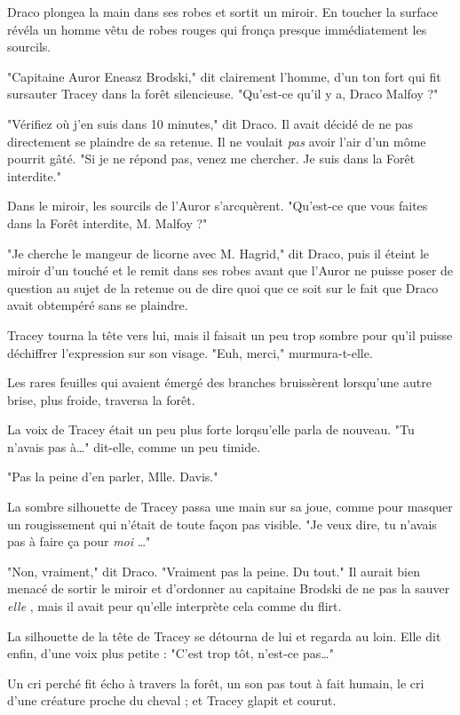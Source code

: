 Draco plongea la main dans ses robes et sortit un miroir. En toucher la surface révéla un homme vêtu de robes rouges qui fronça presque immédiatement les sourcils.

"Capitaine Auror Eneasz Brodski," dit clairement l'homme, d'un ton fort qui fit sursauter Tracey dans la forêt silencieuse. "Qu'est-ce qu'il y a, Draco Malfoy ?"

"Vérifiez où j'en suis dans 10 minutes," dit Draco. Il avait décidé de ne pas directement se plaindre de sa retenue. Il ne voulait \emph{pas}  avoir l'air d'un môme pourrit gâté. "Si je ne répond pas, venez me chercher. Je suis dans la Forêt interdite."

Dans le miroir, les sourcils de l'Auror s'arcquèrent. "Qu'est-ce que vous faites dans la Forêt interdite, M. Malfoy ?"

"Je cherche le mangeur de licorne avec M. Hagrid," dit Draco, puis il éteint le miroir d'un touché et le remit dans ses robes avant que l'Auror ne puisse poser de question au sujet de la retenue ou de dire quoi que ce soit sur le fait que Draco avait obtempéré sans se plaindre.

Tracey tourna la tête vers lui, mais il faisait un peu trop sombre pour qu'il puisse déchiffrer l'expression sur son visage. "Euh, merci," murmura-t-elle.

Les rares feuilles qui avaient émergé des branches bruissèrent lorsqu'une autre brise, plus froide, traversa la forêt.

La voix de Tracey était un peu plus forte lorqsu'elle parla de nouveau. "Tu n'avais pas à…" dit-elle, comme un peu timide.

"Pas la peine d'en parler, Mlle. Davis."

La sombre silhouette de Tracey passa une main sur sa joue, comme pour masquer un rougissement qui n'était de toute façon pas visible. "Je veux dire, tu n'avais pas à faire ça pour \emph{moi} …"

"Non, vraiment," dit Draco. "Vraiment pas la peine. Du tout." Il aurait bien menacé de sortir le miroir et d'ordonner au capitaine Brodski de ne pas la sauver \emph{elle} , mais il avait peur qu'elle interprète cela comme du flirt.

La silhouette de la tête de Tracey se détourna de lui et regarda au loin. Elle dit enfin, d'une voix plus petite : "C'est trop tôt, n'est-ce pas…"

Un cri perché fit écho à travers la forêt, un son pas tout à fait humain, le cri d'une créature proche du cheval ; et Tracey glapit et courut.

